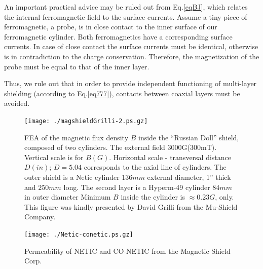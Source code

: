 \documentclass[12pt]{article}
\begin{document}
An important practical advice may be ruled out   from   Eq.\ref{eqBJ}, which
 relates the internal ferromagnetic field to the surface currents.
Assume   a  tiny piece of ferromagnetic, a probe, is in close contact to the inner
surface of our  ferromagnetic cylinder.  Both ferromagnetics have a corresponding surface currents.
In  case of close contact  the  surface currents must  be  identical, otherwise is in   contradiction  to
the charge  conservation. Therefore,  the  magnetization of the probe must  be  
equal to that of  the inner layer.

Thus, we  rule out that  in order to provide  independent functioning of multi-layer 
shielding (according to Eq.\ref{eq777}),
contacts between coaxial layers must  be avoided.


\begin{figure}[htbp]%
\begin{center}
\texttt{[image: ./magshieldGrilli-2.ps.gz]}
\end{center}
\caption{
FEA of the magnetic flux density $B$ inside the ``Russian Doll'' shield,
composed of two cylinders.  The external field 3000G(300mT).
Vertical scale is for  $B(G)$. Horizontal scale - transversal
distance $D(in)$; $D=5.04$ corresponds to the axial line of  cylinders.
The outer shield is a Netic cylinder $136mm$ external diameter, 1'' thick and  $250mm$ long.
The second layer is a Hyperm-49 cylinder $84mm$ in outer  diameter %
Minimum $B$ inside the cylinder is  $\approx0.23G$, only. This figure was  kindly presented
by David Grilli from the Mu-Shield Company.
\label{shieldGrilli}}
\end{figure}
\clearpage






\begin{figure}[htbp]%
\begin{center}
\texttt{[image: ./Netic-conetic.ps.gz]}
\end{center}
\caption{Permeability of NETIC and CO-NETIC from the Magnetic Shield Corp.
\label{muneco}}
\end{figure}
\clearpage


\end{document}

